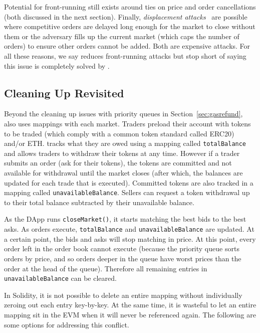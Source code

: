Potential for front-running still exists around ties on price and order cancellations (both discussed in the next section). Finally, \textit{displacement attacks}~\cite{eskandari2019sok} are possible where competitive orders are delayed long enough for the market to close without them or the adversary fills up the current market (which caps the number of orders) to ensure other orders cannot be added. Both are expensive attacks. For all these reasons, we say \cm reduces front-running attacks but stop short of saying this issue is completely solved by \cm. 

\subsection{Cleaning Up Revisited}

Beyond the cleaning up issues with priority queues in Section~\ref{sec:gasrefund}, \cm also uses mappings with each market. Traders preload their account with tokens to be traded (which comply with a common token standard called ERC20) and/or ETH. \cm tracks what they are owed using a mapping called \texttt{totalBalance} and allows traders to withdraw their tokens at any time. However if a trader submits an order (\ie ask for their tokens), the tokens are committed and not available for withdrawal until the market closes (after which, the balances are updated for each trade that is executed). Committed tokens are also tracked in a mapping called \texttt{unavailableBalance}. Sellers can request a token withdrawal up to their total balance subtracted by their unavailable balance.

As the DApp runs \texttt{closeMarket()}, it starts matching the best bids to the best asks. As orders execute, \texttt{totalBalance} and \texttt{unavailableBalance} are updated. At a certain point, the bids and asks will stop matching in price. At this point, every order left in the order book cannot execute (because the priority queue sorts orders by price, and so orders deeper in the queue have worst prices than the order at the head of the queue). Therefore all remaining entries in \texttt{unavailableBalance} can be cleared.

In Solidity, it is not possible to delete an entire mapping without individually zeroing out each entry key-by-key. At the same time, it is wasteful to let an entire mapping sit in the EVM when it will never be referenced again. The following are some options for addressing this conflict.

